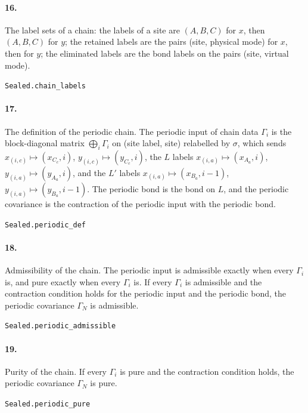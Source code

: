 \documentclass[11pt]{article}
\begin{document}
\paragraph{16.} The label sets of a chain: the labels of a site are $(A, B, C)$ for $x$, then $(A, B, C)$ for $y$; the retained labels are the pairs (site, physical mode) for $x$, then for $y$; the eliminated labels are the bond labels on the pairs (site, virtual mode).\par{\footnotesize\texttt{Sealed.chain\_labels}}

\paragraph{17.} The definition of the periodic chain. The periodic input of chain data $\Gamma_i$ is the block-diagonal matrix $\bigoplus_i \Gamma_i$ on (site label, site) relabelled by $\sigma$, which sends $x_{(i,c)} \mapsto (x_{C_c}, i)$, $y_{(i,c)} \mapsto (y_{C_c}, i)$, the $L$ labels $x_{(i,a)} \mapsto (x_{A_a}, i)$, $y_{(i,a)} \mapsto (y_{A_a}, i)$, and the $L'$ labels $x_{(i,a)} \mapsto (x_{B_a}, i - 1)$, $y_{(i,a)} \mapsto (y_{B_a}, i - 1)$. The periodic bond is the bond on $L$, and the periodic covariance is the contraction of the periodic input with the periodic bond.\par{\footnotesize\texttt{Sealed.periodic\_def}}

\paragraph{18.} Admissibility of the chain. The periodic input is admissible exactly when every $\Gamma_i$ is, and pure exactly when every $\Gamma_i$ is. If every $\Gamma_i$ is admissible and the contraction condition holds for the periodic input and the periodic bond, the periodic covariance $\Gamma_N$ is admissible.\par{\footnotesize\texttt{Sealed.periodic\_admissible}}

\paragraph{19.} Purity of the chain. If every $\Gamma_i$ is pure and the contraction condition holds, the periodic covariance $\Gamma_N$ is pure.\par{\footnotesize\texttt{Sealed.periodic\_pure}}
\end{document}
